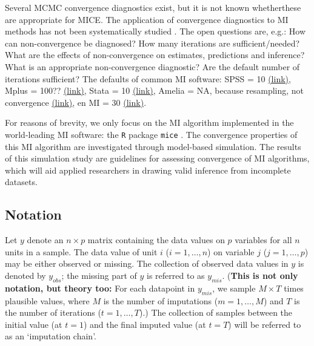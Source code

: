 \documentclass[Royal,times,sageh]{sagej}
\begin{document}
Several MCMC convergence diagnostics exist, but it is not known
whetherthese are appropriate for MICE. The application of convergence
diagnostics to MI methods has not been systematically studied
\citep{buur18}. The open questions are, e.g.: How can non-convergence be
diagnosed? How many iterations are sufficient/needed? What are the
effects of non-convergence on estimates, predictions and inference? What
is an appropriate non-convergence diagnostic? Are the default number of
iterations sufficient? The defaults of common MI software: SPSS = 10
\href{https://www.ibm.com/support/knowledgecenter/SSLVMB_24.0.0/spss/mva/syn_multiple_imputation_impute.html}{(link)},
Mplus = 100??
\href{https://pdfs.semanticscholar.org/e20e/29e008592cbfbaa567931f74cdfdb5451405.pdf?_ga=2.55354671.54033656.1584698748-527613517.1584698748}{(link)},
Stata = 10
\href{https://www.stata.com/manuals13/mi.pdf,\%20p.\%20139}{(link)},
Amelia = NA, because resampling, not convergence
\href{https://cran.r-project.org/web/packages/Amelia/Amelia.pdf}{(link)},
en MI = 30
\href{https://cran.r-project.org/web/packages/mi/mi.pdf}{(link)}.

For reasons of brevity, we only focus on the MI algorithm implemented in
the world-leading MI software: the \texttt{R} \citep{R} package
\texttt{mice} \citep{mice}. The convergence properties of this MI
algorithm are investigated through model-based simulation. The results
of this simulation study are guidelines for assessing convergence of MI
algorithms, which will aid applied researchers in drawing valid
inference from incomplete datasets.

\hypertarget{notation}{%
\subsection{Notation}\label{notation}}

Let \(y\) denote an \(n \times p\) matrix containing the data values on
\(p\) variables for all \(n\) units in a sample. The data value of unit
\(i\) (\(i = 1, \dots, n\)) on variable \(j\) (\(j = 1, \dots, p\)) may
be either observed or missing. The collection of observed data values in
\(y\) is denoted by \(y_{obs}\); the missing part of \(y\) is referred
to as \(y_{mis}\). (\textbf{This is not only notation, but theory too:}
For each datapoint in \(y_{mis}\), we sample \(M \times T\) times
plausible values, where \(M\) is the number of imputations
(\(m = 1, \dots, M\)) and \(T\) is the number of iterations
(\(t = 1, \dots, T\)).) The collection of samples between the initial
value (at \(t=1\)) and the final imputed value (at \(t=T\)) will be
referred to as an `imputation chain'.
\end{document}
